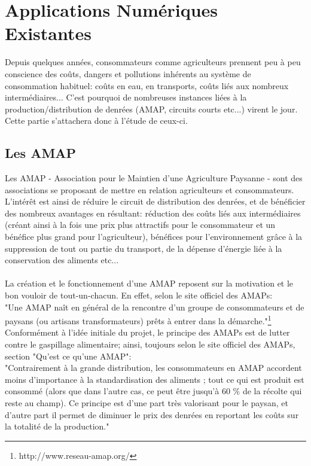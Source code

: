 \chapter*{Applications Numériques Existantes}

Depuis quelques années, consommateurs comme agriculteurs prennent peu à peu conscience des coûts, dangers et pollutions inhérents au système de consommation habituel: coûts en eau, en transports, coûts liés aux nombreux intermédiaires...
C'est pourquoi de nombreuses instances liées à la production/distribution de denrées (AMAP, circuits courts etc...) virent le jour. Cette partie s'attachera donc à l'étude de ceux-ci.

\section*{Les AMAP}
Les AMAP - Association pour le Maintien d'une Agriculture Paysanne - sont des associations se proposant de mettre en relation agriculteurs et consommateurs. L'intérêt est ainsi de réduire le circuit de distribution des denrées, et de bénéficier des nombreux avantages en résultant: réduction des coûts liés aux intermédiaires (créant ainsi à la fois une prix plus attractifs pour le consommateur et un bénéfice plus grand pour l'agriculteur), bénéfices pour l'environnement grâce à la suppression de tout ou partie du transport, de la dépense d'énergie liée à la conservation des aliments etc...\\ \\
La création et le fonctionnement d'une AMAP reposent sur la motivation et le bon vouloir de tout-un-chacun. En effet, selon le site officiel des AMAPs:\\
"Une AMAP naît en général de la rencontre d'un groupe de consommateurs et de paysans (ou artisans transformateurs) prêts à entrer dans la démarche."\footnote{http://www.reseau-amap.org/}\\

Conformément à l'idée initiale du projet, le principe des AMAPs est de lutter contre le gaspillage alimentaire; ainsi, toujours selon le site officiel des AMAPs, section "Qu'est ce qu'une AMAP": \\
"Contrairement à la grande distribution, les consommateurs en AMAP accordent moins d'importance à la standardisation des aliments ; tout ce qui est produit est consommé (alors que dans l'autre cas, ce peut être jusqu'à 60 \% de la récolte qui reste au champ). Ce principe est d'une part très valorisant pour le paysan, et d'autre part il permet de diminuer le prix des denrées en reportant les coûts sur la totalité de la production."


